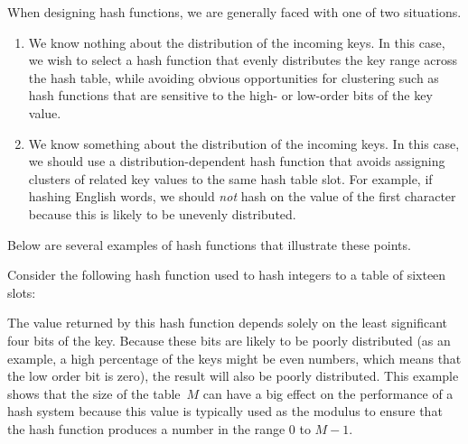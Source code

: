 When designing hash functions, we are generally faced with one of two
situations.

\begin{enumerate}

\item
We know nothing about the distribution of the incoming keys.
In this case, we wish to select a hash function that evenly
distributes the key range across the hash table,
while avoiding obvious opportunities for clustering such as hash
functions that are sensitive to the high- or low-order bits of the key
value.

\item
We know something about the distribution of the incoming keys.
In this case, we should use a distribution-dependent hash function
that avoids assigning clusters of related key values to the same hash
table slot.
For example, if hashing English words, we should \emph{not} hash on
the value of the first character because this is likely to be unevenly
distributed.

\end{enumerate}

\noindent Below are several examples of hash functions that illustrate
these points. 

\begin{example}
Consider the following hash function used to hash integers to a table
of sixteen slots:


The value returned by this hash function depends solely on
the least significant four bits of the key.
Because these bits are likely to be poorly distributed
(as an example, a high percentage of the keys might be even numbers,
which means that the low order bit is zero),
the result will also be poorly distributed.
This example shows that the size of the table~\(M\)
can have a big effect on the performance of a hash system because this
value is typically used as the modulus to ensure that the hash
function produces a number in the range 0 to \(M-1\).
\end{example}

